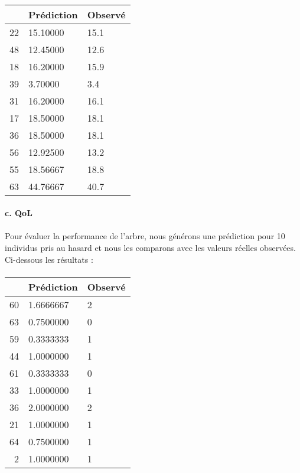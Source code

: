 \documentclass[11pt]{article}
\begin{document}
\paragraph{}

    \begin{tabular}{r|ll}
  & Prédiction & Observé\\
\hline
	22 & 15.10000 & 15.1    \\
	48 & 12.45000 & 12.6    \\
	18 & 16.20000 & 15.9    \\
	39 &  3.70000 &  3.4    \\
	31 & 16.20000 & 16.1    \\
	17 & 18.50000 & 18.1    \\
	36 & 18.50000 & 18.1    \\
	56 & 12.92500 & 13.2    \\
	55 & 18.56667 & 18.8    \\
	63 & 44.76667 & 40.7    \\
\end{tabular}


    
    \paragraph{c. QoL}\label{c.-qol}



    \begin{center}
    \end{center}
    
    
\paragraph{}
Pour évaluer la performance de l'arbre, nous générons une prédiction
pour 10 individus pris au hasard et nous les comparons avec les valeurs
réelles observées. Ci-dessous les résultats :

\paragraph{}

    \begin{tabular}{r|ll}
  & Prédiction & Observé\\
\hline
	60 & 1.6666667 & 2        \\
	63 & 0.7500000 & 0        \\
	59 & 0.3333333 & 1        \\
	44 & 1.0000000 & 1        \\
	61 & 0.3333333 & 0        \\
	33 & 1.0000000 & 1        \\
	36 & 2.0000000 & 2        \\
	21 & 1.0000000 & 1        \\
	64 & 0.7500000 & 1        \\
	2 & 1.0000000 & 1        \\
\end{tabular}
\end{document}
